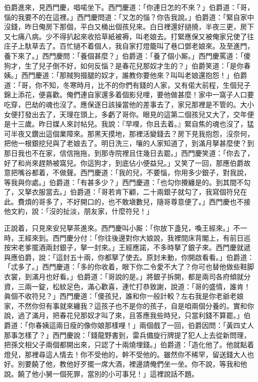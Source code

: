 伯爵進來，見西門慶，唱喏坐下。西門慶道：「你連日怎的不來？」伯爵道：「哥，惱的我要不的在這裡。」西門慶問道：「又怎的惱？你告我說。」伯爵道：「緊自家中沒錢，昨日俺房下那個，平白又桶出個孩兒來。白日裡還好撾撓，半夜三更，房下又七痛八病。少不得扒起來收拾草紙被褥，叫老娘去。打緊應保又被俺家兄使了往庄子上馱草去了。百忙撾不着個人，我自家打燈籠叫了巷口鄧老娘來。及至進門，養下來了。」西門慶問：「養個甚麼？」伯爵道：「養了個小厮。」西門慶罵道：「傻狗才，生了兒子倒不好，如何反惱？是春花兒那奴才生的？」伯爵笑道：「是你春姨。」西門慶道：「那賊狗掇腿的奴才，誰教你要他來？叫叫老娘還抱怨！」伯爵道：「哥，你不知，冬寒時月，比不的你們有錢的人家，又有偌大前程，生個兒子錦上添花，便喜歡。俺們連自家還多着個影兒哩，要他做甚麼！家中一窩子人口要吃穿，巴劫的魂也沒了。應保逐日該操當他的差事去了，家兄那裡是不管的。大小女便打發出去了，天理在頭上，多虧了哥你。{}眼見的這第二個孩兒又大了，交年便是十三歲。昨日媒人來討帖兒。我說：『早哩，你且去着。』緊自焦的魂也沒了，猛可半夜又鑽出這個業障來。那黑天摸地，那裡活變錢去？房下見我抱怨，沒奈何，把他一根銀挖兒與了老娘去了。{}明日洗三，嚷的人家知道了，到滿月拏甚麼使？到那日我也不在家，信信拖拖，到那寺院裡且住幾日去罷。」{}西門慶笑道：「你去了，好了和尚來趕熱被窩兒。你這狗才，到底佔小便益兒。」又笑了一回，那應伯爵故意把嘴谷都着，{}不做聲。{}西門慶道：「我的兒，不要惱，你用多少銀子，對我說，等我與你處。」伯爵道：「有甚多少？」西門慶道：「也勾你攪纏是的。到其間不勾了，又拏衣服當去。」伯爵道：「哥若肯下顧，二十兩銀子就勾了，我寫個符兒在此。費煩的哥多了，不好開口的，也不敢塡數兒，隨哥尊意便了。」西門慶也不接他文約，說：「沒的扯淡，朋友家，什麼符兒！」

正說着，只見來安兒拏茶進來。西門慶叫小厮：「你放下盞兒，喚王經來。」不一時，王經來到。西門慶分付：「你往後邊對你大娘說，我裡間床背閣上，有前日巡按宋老爹擺酒兩封銀子，拏一封來。」王經應諾，不多時拏了銀子來。西門慶就遞與應伯爵，說：「這封五十兩，你都拏了使去。{}原封未動，你開啟看看。」伯爵道：「忒多了。」西門慶道：「多的你收着，眼下你二令愛不大了？你可也替他做些鞋脚衣裳，到滿月也好看。」伯爵道：「哥說的是。」將銀子拆開，都是兩司各府傾就分資，三兩一錠，松紋足色，滿心歡喜，連忙打恭致謝，說道：「哥的盛情，誰肯！眞個不收符兒？」西門慶道：「傻孩兒，誰和你一般計較？左右我是你老爺老娘家，不然你但有事就來纏我？這孩子也不是你的孩子，自是咱兩個分養的。實和你說，過了滿月，把春花兒那奴才叫了來，且答應我些時兒，只當利錢不算罷。」伯爵道：「你春姨這兩日瘦的像你娘那樣哩！」兩個戲了一回，伯爵因問：「黃四丈人那事怎樣了？」西門慶說：「錢龍野書到，雷兵備旋行牌提了犯人上去從新問理，把孫文相父子兩個都開出來，只認了十兩燒埋錢。」伯爵道：「造化他了。他就點着燈兒，那裡尋這人情去！你不受他的，幹不受他的。雖然你不稀罕，留送錢大人也好。別要饒了他，教他好歹擺一席大酒，裡邊請俺們坐一坐。你不說，等我和他說。饒了他小舅一個死罪，當別的小可事兒！」這裡說話不題。

